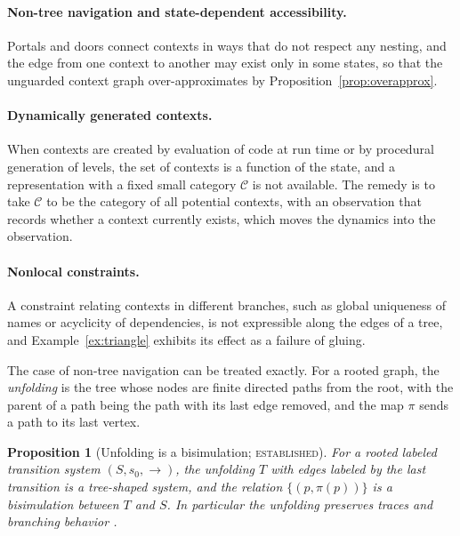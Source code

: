 \documentclass[11pt]{article}
\newtheorem{proposition}[theorem]{Proposition}
\theoremstyle{definition}
\theoremstyle{remark}
\newcommand{\stE}{\textsc{established}}
\newcommand{\cC}{\mathcal C}
\begin{document}
\paragraph{Non-tree navigation and state-dependent accessibility.} Portals and doors connect contexts in ways that do not respect any nesting, and the edge from one context to another may exist only in some states, so that the unguarded context graph over-approximates by Proposition~\ref{prop:overapprox}.

\paragraph{Dynamically generated contexts.} When contexts are created by evaluation of code at run time or by procedural generation of levels, the set of contexts is a function of the state, and a representation with a fixed small category $\cC$ is not available. The remedy is to take $\cC$ to be the category of all potential contexts, with an observation that records whether a context currently exists, which moves the dynamics into the observation.

\paragraph{Nonlocal constraints.} A constraint relating contexts in different branches, such as global uniqueness of names or acyclicity of dependencies, is not expressible along the edges of a tree, and Example~\ref{ex:triangle} exhibits its effect as a failure of gluing.

The case of non-tree navigation can be treated exactly. For a rooted graph, the \emph{unfolding} is the tree whose nodes are finite directed paths from the root, with the parent of a path being the path with its last edge removed, and the map $\pi$ sends a path to its last vertex.

\begin{proposition}[Unfolding is a bisimulation; \stE]\label{prop:unfold}
For a rooted labeled transition system $(S,s_0,\to)$, the unfolding $T$ with edges labeled by the last transition is a tree-shaped system, and the relation $\{(p,\pi(p))\}$ is a bisimulation between $T$ and $S$. In particular the unfolding preserves traces and branching behavior \cite{sangiorgi}.
\end{proposition}
\end{document}
